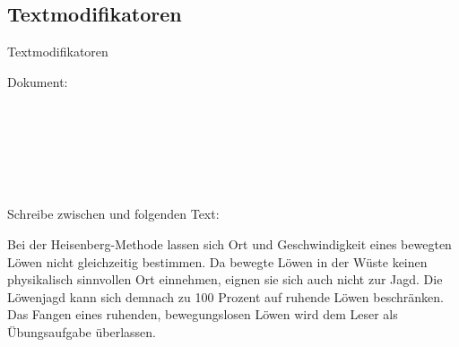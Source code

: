 \subsection{Textmodifikatoren}
\begin{frame}[c]
	\begin{center}
		\large Textmodifikatoren
	\end{center}
\end{frame}
\begin{frame}[fragile]
	Dokument:
	\begin{lstlisting}[breaklines=true,gobble=4]
        
        
        
        
        
        
	\end{lstlisting}
	\pause\btVFill
	\Aufgabee
	Schreibe zwischen \lstinline[basicstyle=\normalfont\ttfamily\normalsize]|| und \lstinline[basicstyle=\normalfont\ttfamily\normalsize]|| folgenden Text:
	\begin{outputbox}
		Bei der Heisenberg-Methode lassen sich Ort und Geschwindigkeit eines bewegten Löwen nicht gleichzeitig bestimmen. Da bewegte Löwen in der Wüste keinen physikalisch sinnvollen Ort einnehmen, eignen sie sich auch nicht zur Jagd. Die Löwenjagd kann sich demnach zu 100 Prozent auf ruhende Löwen beschränken. Das Fangen eines ruhenden, bewegungslosen Löwen wird dem Leser als Übungsaufgabe überlassen.
	\end{outputbox}
	\vspace{0.2cm}
\end{frame}
